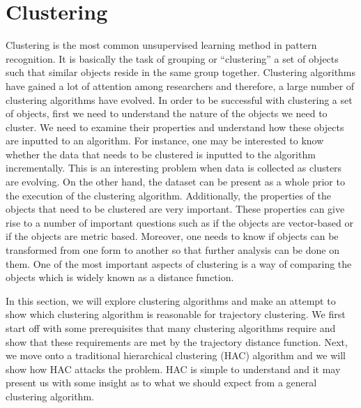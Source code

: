 \documentclass[a4paper, 12pt]{article}
\begin{document}
\section{Clustering}
Clustering is the most common unsupervised learning method in pattern recognition. It is basically the task of grouping or “clustering” a set of objects such that similar objects reside in the same group together. Clustering algorithms have gained a lot of attention among researchers and therefore, a large number of clustering algorithms have evolved. In order to be successful with clustering a set of objects, first we need to understand the nature of the objects we need to cluster. We need to examine their properties and understand how these objects are inputted to an algorithm. For instance, one may be interested to know whether the data that needs to be clustered is inputted to the algorithm incrementally. This is an interesting problem when data is collected as clusters are evolving. On the other hand, the dataset can be present as a whole prior to the execution of the clustering algorithm. Additionally, the properties of the objects that need to be clustered are very important. These properties can give rise to a number of important questions such as if the objects are vector-based or if the objects are metric based. Moreover, one needs to know if objects can be transformed from one form to another so that further analysis can be done on them. One of the most important aspects of clustering is a way of comparing the objects which is widely known as a distance function. 

In this section, we will explore clustering algorithms and make an attempt to show which clustering algorithm is reasonable for trajectory clustering. We first start off with some prerequisites that many clustering algorithms require and show that these requirements are met by the trajectory distance function. Next, we move onto a traditional hierarchical clustering (HAC) algorithm and we will show how HAC attacks the problem. HAC is simple to understand and it may present us with some insight as to what we should expect from a general clustering algorithm.
\end{document}
